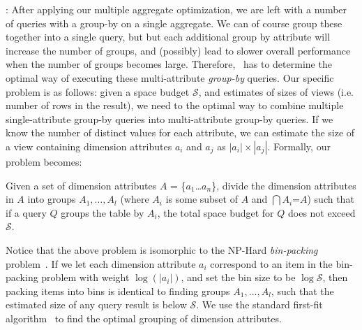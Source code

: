 :
After applying our multiple aggregate optimization, we are left with a number of 
queries with a group-by on a single aggregate.
We can of course group these together into a single query, but but each additional 
group by attribute will increase the number of groups, and (possibly) lead to slower
overall performance when the number of groups becomes large.  
Therefore, \SeeDB\ has to determine the optimal way of executing these multi-attribute
{\it group-by} queries.
Our specific problem is as follows: given a space budget $\mathcal{S}$,
and estimates of sizes of views (i.e. number of rows in the result), we need to the optimal
way to combine multiple single-attribute group-by queries into multi-attribute group-by queries.
If we know the number of distinct values for each attribute, we can estimate the
size of a view containing dimension attributes $a_i$ and $a_j$ as $|a_i|\times |a_j|$.
Formally, our problem becomes:
\vspace{-5pt}
\begin{problem}
Given a set of dimension attributes $A$ = \{$a_1$\ldots$a_n$\}, divide the
dimension attributes in $A$ into groups $A_1, \ldots, A_l$ (where $A_i$ is some
subset of $A$ and $\bigcap A_i$=$A$) such that if a query $Q$ groups the table by $A_i$, 
the total space budget for $Q$ does not exceed $\mathcal{S}$.
\vspace{-5pt}
\end{problem}

Notice that the above problem is isomorphic to the NP-Hard {\em bin-packing} problem~\cite{garey}.
If we let each dimension attribute
$a_i$ correspond to an item in the bin-packing problem with weight $\log (|a_i|)$,
and set the bin size to be $\log \mathcal{S}$,
then packing items into bins is identical to finding groups $A_1, \ldots, A_l$,
such that the estimated size of any query result is below $\mathcal{S}$.
We use the standard first-fit algorithm~\cite{first-fit} to find the optimal
grouping of dimension attributes.

